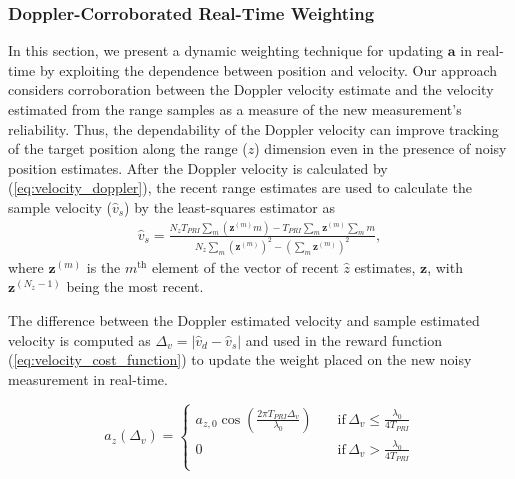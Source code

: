 \documentclass[10pt,journal,final]{IEEEtran}
\begin{document}
\subsubsection{Doppler-Corroborated Real-Time Weighting}
In this section, we present a dynamic weighting technique for updating $\mathbf{a}$ in real-time by exploiting the dependence between position and velocity.
Our approach considers corroboration between the Doppler velocity estimate and the velocity estimated from the range samples as a measure of the new measurement's reliability. 
Thus, the dependability of the Doppler velocity can improve tracking of the target position along the range ($z$) dimension even in the presence of noisy position estimates. 
After the Doppler velocity is calculated by (\ref{eq:velocity_doppler}), the recent range estimates are used to calculate the sample velocity ($\hat{v}_s$) by the least-squares estimator as
\begin{gather}
	\hat{v}_s = \frac{N_z T_{PRI} \sum_m (\mathbf{z}^{(m)} m) - T_{PRI} \sum_m \mathbf{z}^{(m)} \sum_m m}{N_z \sum_m (\mathbf{z}^{(m)})^2 - \left( \sum_m \mathbf{z}^{(m)} \right)^2},
\end{gather}
where $\mathbf{z}^{(m)}$ is the $m^{\text{th}}$ element of the vector of recent $\hat{z}$ estimates, $\mathbf{z}$, with $\mathbf{z}^{(N_z-1)}$ being the most recent. 

The difference between the Doppler estimated velocity and sample estimated velocity is computed as $\Delta_v = |\hat{v}_d - \hat{v}_s|$ and used in the reward function (\ref{eq:velocity_cost_function}) to update the weight placed on the new noisy measurement in real-time. 

\begin{equation}
	\label{eq:velocity_cost_function}
	a_z (\Delta_v)=\begin{cases}
		a_{z,0} \cos \left(\frac{2\pi T_{PRI} \Delta_v}{\lambda_0}\right) \quad &\text{if} \, \Delta_v \leq \frac{\lambda_0}{4T_{PRI}} \\
		0 \quad &\text{if} \, \Delta_v > \frac{\lambda_0}{4T_{PRI}} \\
	\end{cases}
\end{equation}
\end{document}
